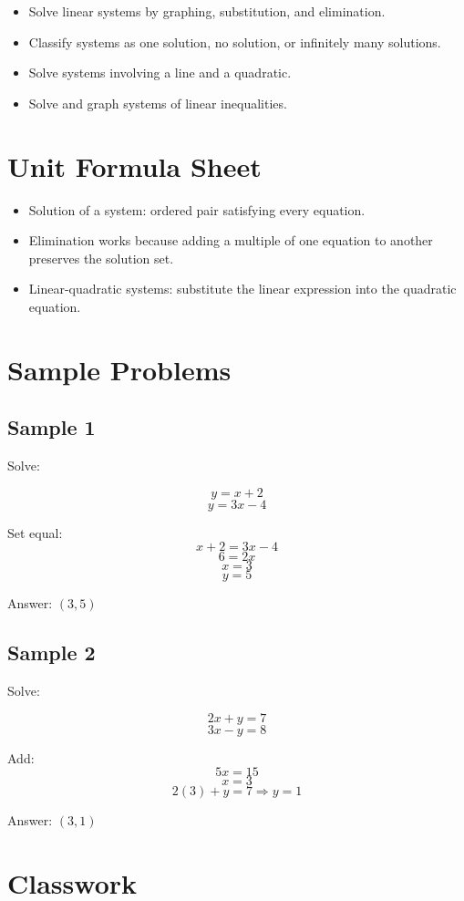 \documentclass[11pt]{book}
\begin{document}
\begin{itemize}
\item Solve linear systems by graphing, substitution, and elimination.
\item Classify systems as one solution, no solution, or infinitely many solutions.
\item Solve systems involving a line and a quadratic.
\item Solve and graph systems of linear inequalities.
\end{itemize}

\section{Unit Formula Sheet}

\begin{itemize}
\item Solution of a system: ordered pair satisfying every equation.
\item Elimination works because adding a multiple of one equation to another preserves the solution set.
\item Linear-quadratic systems: substitute the linear expression into the quadratic equation.
\end{itemize}

\section{Sample Problems}

\subsection{Sample 1}

Solve:

\[y=x+2\]
\[y=3x-4\]

Set equal:
\[x+2=3x-4\]
\[6=2x\]
\[x=3\]
\[y=5\]

Answer: \((3,5)\)

\subsection{Sample 2}

Solve:

\[2x+y=7\]
\[3x-y=8\]

Add:
\[5x=15\]
\[x=3\]
\[2(3)+y=7\Rightarrow y=1\]

Answer: \((3,1)\)

\section{Classwork}
\end{document}

